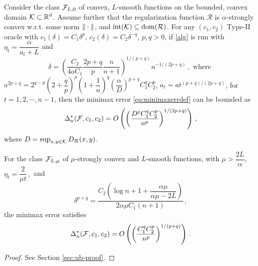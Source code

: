 \begin{theorem}
\label{thm:ub}
Consider the class $\mathcal{F}_{L,0}$ of convex, $L$-smooth functions on the bounded, convex domain $\mathcal{K} \subset \mathbb{R}^d$.
Assume further that the regularization function $\mathcal{R}$ is $\alpha$-strongly convex w.r.t. some norm $\|\cdot\|$, and $\operatorname{int}(\mathcal{K})\subseteq \operatorname{dom}(\mathcal{R})$.
For any $(c_1,c_2)$ Type-II oracle 
 with $c_1(\delta) = C_1 \delta^p$, $c_2(\delta) = C_2 \delta^{-q}$, $p,q>0$, 
 if \cref{alg} is run with $\eta_t = \dfrac{\alpha}{a_t+L}$ and
  \[
 \delta = \left( \dfrac{C_2}{4aC_1}\dfrac{2p+q}{p}\dfrac{n}{n+1}\right)^{1/(p+q)}n^{-1/(2p+q)} \,, \text{ where }
 \] 
 $a^{2p+q} =2^{q-p}\left( 2+\dfrac{q}{p} \right)^p\left(1+ \dfrac{1}{n} \right)^q \left( \dfrac{\alpha}{D} \right)^{p+q}C_1^q C_2^p $,
 $a_t = a t^{(p+q)/(2p+q)}$, for $t=1, 2, \cdots, n-1$,
then  the minimax error \eqref{eq:minimaxerrdef} can be bounded as
 \begin{align*}
\Delta_n^*(\mathcal{F},c_1,c_2)= O\left(\left(\dfrac{D^pC_1^qC_2^p}{n^p}\right)^{1/(2p+q)}\right)\,,
 \end{align*}
 where $D=\sup_{x,y\in \mathcal{K}} D_{\mathcal{R}}(x,y)$.
 
For the class $\mathcal{F}_{L,\mu}$ of $\mu$-strongly convex and $L$-smooth functions, with $\mu > \dfrac{2L}{\alpha}$, 
$
 \eta_t = \dfrac{2}{\mu t} \,,
$ and
\[
\delta^{p+q} =  \dfrac{C_2\left( \log n+1+\dfrac{\alpha \mu}{\alpha \mu -2L}\right)}{2\alpha \mu C_1 (n+1)} \,,
\]
the minimax error satisfies 
 \begin{align*}
\Delta_n^*(\mathcal{F},c_1,c_2)= O\left( \left(\dfrac{C_1^q C_2^p}{n^p} \right)^{1/(p+q)} \right)\,.
 \end{align*}
\end{theorem}
\begin{proof}
See Section \ref{sec:ub-proof}.
\end{proof}


